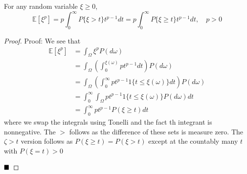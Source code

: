 \begin{lemma}
    For any random variable $\xi \geq 0$,
    \[ \mathbb{E}[\xi^{p}] = p\int_{0}^{\infty} P\{\xi > t\}t^{p - 1}dt = p\int_{0}^{\infty} P\{\xi \geq t\}t^{p - 1}dt, \quad p > 0 \]
\end{lemma}
\begin{proof}{Proof:}
    We see that
    \begin{align*}
        \mathbb{E}[\xi^{p}] &= \int_{\Omega} \xi^{p}P(d\omega)\\
        &= \int_{\Omega}\left(\int_{0}^{\xi(\omega)} pt^{p - 1}dt\right)P(d\omega)\\
        &= \int_{\Omega}\left(\int_{0}^{\infty} pt^{p - 1}1\{t \leq \xi(\omega)\}dt\right)P(d\omega)\\
        &= \int_{0}^{\infty}\int_{\Omega} pt^{p - 1}1\{t \leq \xi(\omega)\}P(d\omega)dt\\
        &= \int_{0}^{\infty} pt^{p - 1}P(\xi \geq t)dt
    \end{align*}
    where we swap the integrals using Tonelli and the fact th integrant is nonnegative. The $>$ follows as the difference of these sets is measure zero. The $\zeta > t$ version follows as $P(\xi \geq t) = P(\xi > t)$ except at the countably many $t$ with $P(\xi = t) > 0$
    
    $\qed$
\end{proof}
